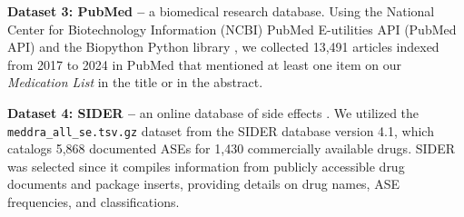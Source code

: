 \documentclass[referee,bst/sn-basic]{sn-jnl}%
\theoremstyle{thmstyletwo}%
\theoremstyle{thmstylethree}%
\begin{document}
\begin{comment}
    
\begin{table}[h]
\caption{Subreddits that were used to collect social media posts involving GLP-1 RAs.}
\label{tbl:reddit}
\centering
\begin{tabular}{ll}
\toprule
Subreddit               & \# Members$^*$ \\
\midrule
r/diabetes            & 109K \\
r/diabetes\_t2            & 29.4K \\
r/GLP1       & 1.3K \\
r/liraglutide            & 11.7K \\
r/loseit         & 3900K \\
r/MaintenancePhase             & 25.6K \\
r/medicine           & 453K \\
r/Ozempic                  & 50.1K \\
r/OzempicForWeightLoss     & 13.7K \\
r/semaglutidecompounds           & 7.2K \\
r/Semaglutide              & 45K \\
r/TheMorningToastSnark              & 11.6K \\
r/trulicity              & 1.1K \\
r/type2diabetes           & 8.4K \\
\bottomrule
\end{tabular}
$^*$Number of members (in thousands) of each subreddit as of October 2, 2023.
\end{table}

\end{comment}

\textbf{Dataset 3: PubMed --}
a biomedical research database.
Using the National Center for Biotechnology Information (NCBI) PubMed E-utilities API (PubMed API) \cite{sayers2023eutilities} 
and the Biopython Python library \cite{chapman2000biopython}, 
we collected 13,491 articles indexed from 2017 to 2024 in PubMed that mentioned at least one item on our \textit{Medication List} in the title or in the abstract.

\textbf{Dataset 4: SIDER -- }
an online database of side effects \cite{kuhn2016sider}.
We utilized the \texttt{meddra\_all\_se.tsv.gz} dataset from the SIDER database version 4.1, which catalogs 5,868 documented ASEs for 1,430 commercially available drugs. 
SIDER was selected since it compiles information from publicly accessible drug documents and package inserts, providing details on drug names, ASE frequencies, and classifications.
\end{document}
